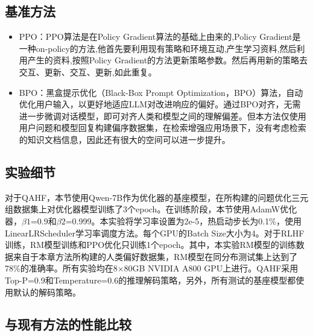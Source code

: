 \subsection{基准方法}

\begin{itemize}[topsep = 0 pt, itemsep= 0 pt, parsep=0pt, partopsep=0pt, leftmargin=36pt, itemindent=0pt, labelsep=6pt, listparindent=24pt]
	\item PPO\cite{DBLP:journals/corr/SchulmanWDRK17}：PPO算法是在Policy Gradient算法的基础上由来的,Policy Gradient是一种on-policy的方法,他首先要利用现有策略和环境互动,产生学习资料,然后利用产生的资料,按照Policy Gradient的方法更新策略参数。然后再用新的策略去交互、更新、交互、更新,如此重复。
	\item BPO\cite{DBLP:journals/corr/abs-2311-04155}：黑盒提示优化（Black-Box Prompt Optimization，BPO）算法，自动优化用户输入，以更好地适应LLM对改进响应的偏好。通过BPO对齐，无需进一步微调对话模型，即可对齐人类和模型之间的理解偏差。但本方法仅使用用户问题和模型回复构建偏序数据集，在检索增强应用场景下，没有考虑检索的知识文档信息，因此还有很大的空间可以进一步提升。
\end{itemize}

\subsection{实验细节}

对于QAHF，本节使用Qwen-7B\cite{DBLP:journals/corr/abs-2309-16609}作为优化器的基座模型，在所构建的问题优化三元组数据集上对优化器模型训练了3个epoch。在训练阶段，本节使用AdamW优化器，$\beta1$=0.9和$\beta2$=0.999。本实验将学习率设置为2e-5，热启动步长为0.1\%，使用LinearLRScheduler学习率调度方法。每个GPU的Batch Size大小为4。对于RLHF训练，RM模型训练和PPO优化只训练1个epoch。其中，本实验RM模型的训练数据来自于本章方法所构建的人类偏好数据集，RM模型在同分布测试集上达到了78\%的准确率。所有实验均在8×80GB NVIDIA A800 GPU上进行。QAHF采用Top-P=0.9和Temperature=0.6的推理解码策略，另外，所有测试的基座模型都使用默认的解码策略。

\subsection{与现有方法的性能比较}

